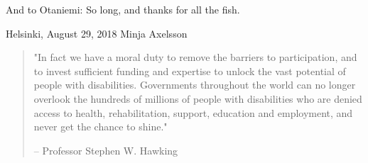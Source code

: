 \documentclass[12pt,a4paper,oneside,pdftex]{report}
\newcommand{\DATE}{August 29, 2018}
\newcommand{\AUTHOR}{Minja Axelsson}
\begin{document}
\vskip 3mm

\noindent And to Otaniemi: So long, and thanks for all the fish.

\vskip 10mm

\noindent Helsinki, \DATE
\vskip 5mm
\noindent\AUTHOR

\newpage


\vspace*{\fill} 
\begin{quote} 
\centering 
\noindent "In fact we have a moral duty to remove the barriers to participation, and to invest sufficient funding and expertise to unlock the vast potential of people with disabilities. Governments throughout the world can no longer overlook the hundreds of millions of people with disabilities who are denied access to health, rehabilitation, support, education and employment, and never get the chance to shine."
\vskip 5mm

\noindent – Professor Stephen W. Hawking
\end{quote}
\vspace*{\fill}















\cleardoublepage
%

\cleardoublepage
\tableofcontents


\end{document}
